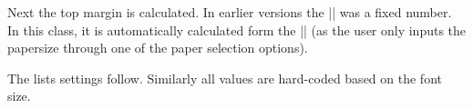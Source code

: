 \begin{multicols}{2}
 Next the top margin is calculated.  In earlier versions the |\topmargin| was a fixed number. In this class, it is automatically calculated form the |\paperheight| (as the user only inputs the papersize through one of the paper selection options).
\end{multicols}

\begin{teX}
\if@compatibility
  \setlength\topmargin{.75in}
\else
  \setlength\topmargin{\paperheight}
  \addtolength\topmargin{-2in}
  \addtolength\topmargin{-\headheight}
  \addtolength\topmargin{-\headsep}
  \addtolength\topmargin{-\textheight}
  \addtolength\topmargin{-\footskip}     %
  \addtolength\topmargin{-.5\topmargin}
  \@settopoint\topmargin
\fi
\end{teX}

The lists settings follow. Similarly all values are hard-coded based on the font size.
\begin{teX}
\setlength{}
\setlength{\skip\footins}{9\p@ \@plus 4\p@ \@minus 2\p@}
\setlength{}
\setlength{}
\setlength{}
\setlength{}
\setlength{}
\setlength{}
\setlength{}
\setlength{}
\setlength{}
\setlength{}
\setlength{}
\end{teX}

